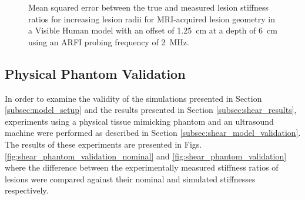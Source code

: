 			\begin{figure}[!htb]
				\centering
				\caption[Shear-wave speed quantified mean squared error related to MRI-acquired lesion size in a Visible Human model]{Mean squared error between the true and measured lesion stiffness ratios for increasing lesion radii for MRI-acquired lesion geometry in a Visible Human model with an offset of \SI{1.25}{\cm} at a depth of \SI{6}{\cm} using an ARFI probing frequency of \SI{2}{\MHz}.}
				\label{fig:erel_human_radius_mse}
			\end{figure}

		\FloatBarrier
		\subsection{Physical Phantom Validation}
			In order to examine the validity of the simulations presented in Section \ref{subsec:model_setup} and the results presented in Section \ref{subsec:shear_results}, experiments using a physical tissue mimicking phantom and an ultrasound machine were performed as described in Section \ref{subsec:shear_model_validation}. The results of these experiments are presented in Figs. \ref{fig:shear_phantom_validation_nominal} and \ref{fig:shear_phantom_validation} where the difference between the experimentally measured stiffness ratios of lesions were compared against their nominal and simulated stiffnesses respectively.

